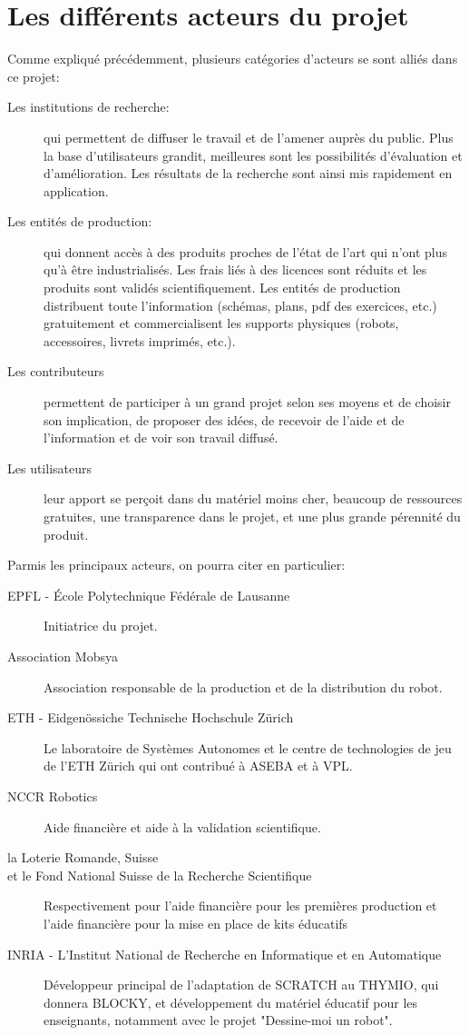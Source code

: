 \documentclass[a4paper, 12pt]{report}
\begin{document}
\section{Les différents acteurs du projet \cite{thymio2016}}
Comme expliqué précédemment, plusieurs catégories d'acteurs se sont alliés dans ce projet:
\begin{description}
\item[Les institutions de recherche: ]qui permettent de diffuser le travail et de l'amener auprès du public. Plus la base d'utilisateurs grandit, meilleures sont les possibilités d'évaluation et d'amélioration. Les résultats de la recherche sont ainsi mis rapidement en application.
\item[Les entités de production: ] qui donnent accès à des produits proches de l'état de l'art qui n'ont plus qu'à être industrialisés. Les frais liés à des licences sont réduits et les produits sont validés scientifiquement. Les entités de production distribuent toute l'information (schémas, plans, pdf des exercices, etc.) gratuitement et commercialisent les supports physiques (robots, accessoires, livrets imprimés, etc.).
\item[Les contributeurs] permettent de participer à un grand projet selon ses moyens et de choisir son implication, de proposer des idées, de recevoir de l'aide et de l'information et de voir son travail diffusé.
\item[Les utilisateurs] leur apport se perçoit dans du matériel moins cher, beaucoup de ressources gratuites, une transparence dans le projet, et une plus grande pérennité du produit.
\end{description}

Parmis les principaux acteurs, on pourra citer en particulier:
\begin{description}
\item[EPFL - École Polytechnique Fédérale de Lausanne] Initiatrice du projet.
\item[Association Mobsya] Association responsable de la production et de la distribution du robot.
\item[ETH - Eidgenössiche Technische Hochschule Zürich] Le laboratoire de Systèmes Autonomes et le centre de technologies de jeu de l'ETH Zürich qui ont contribué à ASEBA et à VPL.
\item[NCCR Robotics] Aide financière et aide à la validation scientifique.
\item[la Loterie Romande, Suisse]
\item[et le Fond National Suisse de la Recherche Scientifique] Respectivement pour l'aide financière pour les premières production et l'aide financière pour la mise en place de kits éducatifs
\item[INRIA - L'Institut National de Recherche en Informatique et en Automatique] Développeur principal de l'adaptation de SCRATCH au THYMIO, qui donnera BLOCKY, et développement du matériel éducatif pour les enseignants, notamment avec le projet "Dessine-moi un robot". 

\end{description} 
\end{document}
